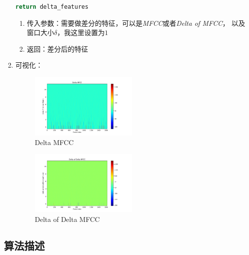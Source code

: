 \documentclass[a4paper]{article}
\begin{document}
\begin{enumerate}
{\begin{lstlisting}[language=python]
  return delta_features
    \end{lstlisting}
    \begin{enumerate}
      \item 传入参数：需要做差分的特征，可以是\emph{MFCC}或者\emph{Delta of MFCC}，
      以及窗口大小$\delta$，我这里设置为$1$
      \item 返回：差分后的特征
    \end{enumerate}
  }
  \item 
  {
    可视化：
    \begin{figure}[H]
      \centering
      \includegraphics[width=0.5\textwidth]{figs/visualize_Delta_MFCC.pdf}
      \caption{Delta MFCC}
      \label{fig:Delta MFCC}
    \end{figure}
    \begin{figure}[H]
      \centering
      \includegraphics[width=0.5\textwidth]{figs/visualize_Delta_of_Delta_MFCC.pdf}
      \caption{Delta of Delta MFCC}
      \label{fig:Delta of Delta MFCC}
    \end{figure}

  }
\end{enumerate}


\subsection{算法描述}
\end{document}
